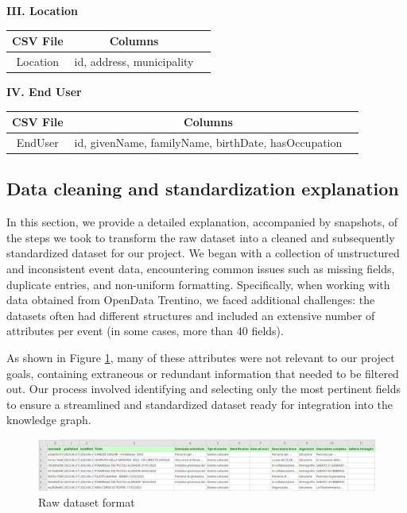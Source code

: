 \textbf{\normalsize III. Location}
\vspace{-7pt}
\begin{table}[H]
    \centering
    \begin{tabular}{|c|c|c|}
        \hline
        \textbf{CSV File} & \textbf{Columns} \\ \hline
        Location & id, address, municipality \\ \hline
    \end{tabular}
\end{table}

\textbf{\normalsize IV. End User}
\vspace{-7pt}
\begin{table}[H]
    \centering
    \begin{tabular}{|c|c|c|}
        \hline
        \textbf{CSV File} & \textbf{Columns} \\ \hline
        EndUser & id, givenName, familyName, birthDate, hasOccupation \\ \hline
    \end{tabular}
\end{table}

\subsection{Data cleaning and standardization explanation}
In this section, we provide a detailed explanation, accompanied by snapshots, of the steps we took to transform the raw dataset into a cleaned and subsequently standardized dataset for our project. We began with a collection of unstructured and inconsistent event data, encountering common issues such as missing fields, duplicate entries, and non-uniform formatting. Specifically, when working with data obtained from OpenData Trentino, we faced additional challenges: the datasets often had different structures and included an extensive number of attributes per event (in some cases, more than 40 fields).
\vspace{0.4cm}

\noindent As shown in Figure \ref{fig:raw_data}, many of these attributes were not relevant to our project goals, containing extraneous or redundant information that needed to be filtered out. Our process involved identifying and selecting only the most pertinent fields to ensure a streamlined and standardized dataset ready for integration into the knowledge graph.
\begin{figure}[H]
    \centering
    \includegraphics[width=1\linewidth]{knowdive-files/raw_dataset.png}
    \caption{Raw dataset format}
    \label{fig:raw_data}
\end{figure}

